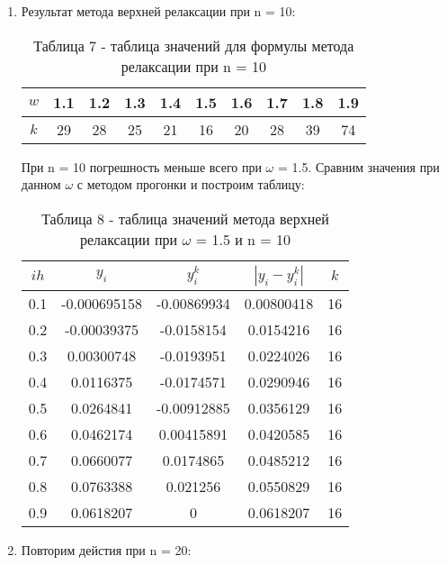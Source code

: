 \documentclass[a4paper,12pt]{article}
\begin{document}
\begin{enumerate}[label = \arabic*.]
  \item {Результат метода верхней релаксации при n = 10:
      \begin{table}[h]
        \centering
        \begin{tabular}{|c|c|c|c|c|c|c|c|c|c|}
          \hline
          $w$ & 1.1 & 1.2 & 1.3 & 1.4 & 1.5 & 1.6 & 1.7 & 1.8 & 1.9\\ \hline
          $k$ & 29 & 28 & 25 & 21 & 16 & 20 & 28 & 39 & 74\\ \hline
        \end{tabular}
        \caption*{\small{Таблица 7 - таблица значений для формулы метода релаксации при n = 10}}
      \end{table}

  \hspace{0.5cm} При n = 10 погрешность меньше всего при $\omega$ = 1.5. 
  Сравним значения при данном $\omega$ с методом прогонки и построим таблицу:
  \begin{table}[h]
    \centering
    \begin{tabular}{|c|c|c|c|c|}
      \hline
      $ih$ & $y_i$ & $y^k_i$ & $\left|y_i-y^k_i\right|$ & $k$\\ \hline
      0.1 & -0.000695158 &  -0.00869934 &   0.00800418 & 16\\ \hline
      0.2 &  -0.00039375 &   -0.0158154 &    0.0154216 & 16\\ \hline
      0.3 &   0.00300748 &   -0.0193951 &    0.0224026 & 16\\ \hline
      0.4 &    0.0116375 &   -0.0174571 &    0.0290946 & 16\\ \hline
      0.5 &    0.0264841 &  -0.00912885 &    0.0356129 & 16\\ \hline
      0.6 &    0.0462174 &   0.00415891 &    0.0420585 & 16\\ \hline
      0.7 &    0.0660077 &    0.0174865 &    0.0485212 & 16\\ \hline
      0.8 &    0.0763388 &     0.021256 &    0.0550829 & 16\\ \hline
      0.9 &    0.0618207 &            0 &    0.0618207 & 16\\ \hline
    \end{tabular}
    \caption*{\small{Таблица 8 - таблица значений метода верхней релаксации при $\omega$ = 1.5 и n = 10}}
  \end{table}
  }
  \item {Повторим дейстия при n = 20:
    \begin{table}[h]

\end{table}}
\end{enumerate}
\end{document}
